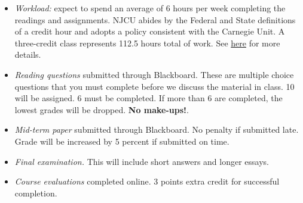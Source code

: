 \documentclass[article,oneside]{memoir}
\begin{document}
\begin{itemize}


\item \textit{Workload:} expect to spend an average of 6 hours per week completing the readings and assignments. NJCU abides by the Federal and State definitions of a credit hour and adopts a policy consistent with the Carnegie Unit. A three-credit class represents 112.5 hours total of work. See \href{http://scottoconnor.org/resources/Credit.pdf}{here} for more details.




\item \textit{Reading questions} submitted through Blackboard. These are multiple choice questions that you must complete before we discuss the material in class. 10 will be assigned. 6 must be completed. If more than 6 are completed, the lowest grades will be dropped. \textbf{No make-ups!}.



\item \textit{Mid-term paper} submitted through Blackboard. No penalty if submitted late. Grade will be increased by 5 percent if submitted on time.




\item \textit{Final examination.} This will include short answers and longer essays.  

\item \textit{Course evaluations} completed online. 3 points extra credit for successful completion.


\end{itemize}
\end{document}
